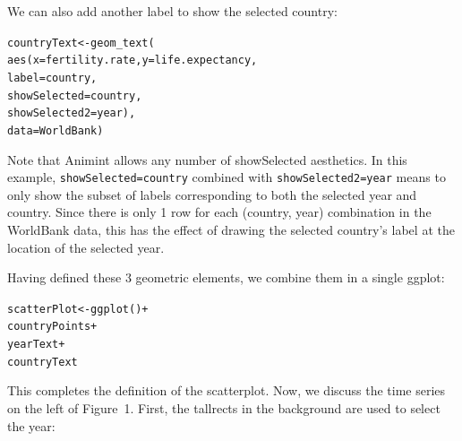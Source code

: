 \documentclass[10pt,journal,compsoc]{IEEEtran}\usepackage[]{graphicx}\usepackage[]{color}
\makeatletter
\newcommand{\hlopt}[1]{\textcolor[rgb]{0,0,0}{#1}}%
\newcommand{\hlstd}[1]{\textcolor[rgb]{0,0,0}{#1}}%
\newcommand{\hlkwb}[1]{\textcolor[rgb]{0,0,0}{#1}}%
\newcommand{\hlkwc}[1]{\textcolor[rgb]{0,0,1}{#1}}%
\newcommand{\hlkwd}[1]{\textcolor[rgb]{0,0,0}{#1}}%
\newenvironment{kframe}{%
 \def\at@end@of@kframe{}%
 \ifinner\ifhmode%
  \def\at@end@of@kframe{\end{minipage}}%
  \begin{minipage}{\columnwidth}%
 \fi\fi%
 \def\FrameCommand##1{\hskip\@totalleftmargin \hskip-\fboxsep
 \colorbox{shadecolor}{##1}\hskip-\fboxsep
     \hskip-\linewidth \hskip-\@totalleftmargin \hskip\columnwidth}%
 \MakeFramed {\advance\hsize-\width
   \@totalleftmargin\z@ \linewidth\hsize
   \@setminipage}}%
 {\par\unskip\endMakeFramed%
 \at@end@of@kframe}
\newenvironment{knitrout}{}{} %
\makeatother
\begin{document}


We can also add another label to show the selected country:

\begin{knitrout}
\color{fgcolor}\begin{kframe}
\begin{alltt}
\hlstd{countryText} \hlkwb{<-} \hlkwd{geom_text}\hlstd{(}
    \hlkwd{aes}\hlstd{(}\hlkwc{x}\hlstd{=fertility.rate,} \hlkwc{y}\hlstd{=life.expectancy,}
        \hlkwc{label}\hlstd{=country,}
        \hlkwc{showSelected}\hlstd{=country,}
        \hlkwc{showSelected2}\hlstd{=year),}
    \hlkwc{data}\hlstd{=WorldBank)}
\end{alltt}
\end{kframe}
\end{knitrout}

Note that Animint allows any number of \mbox{showSelected}
aesthetics. In this example, \texttt{showSelected=country} combined
with \texttt{showSelected2=year} means to only show the subset of
labels corresponding to both the selected year and country.  Since
there is only 1 row for each (country, year) combination in the
WorldBank data, this has the effect of drawing the selected country's
label at the location of the selected year.

Having defined these 3 geometric elements, we combine them in a single
ggplot:

\begin{knitrout}
\color{fgcolor}\begin{kframe}
\begin{alltt}
\hlstd{scatterPlot} \hlkwb{<-} \hlkwd{ggplot}\hlstd{()}\hlopt{+}
  \hlstd{countryPoints}\hlopt{+}
  \hlstd{yearText}\hlopt{+}
  \hlstd{countryText}
\end{alltt}
\end{kframe}
\end{knitrout}

This completes the definition of the scatterplot. Now, we discuss the
time series on the left of Figure~1. First, the tallrects in the
background are used to select the year:
\end{document}

